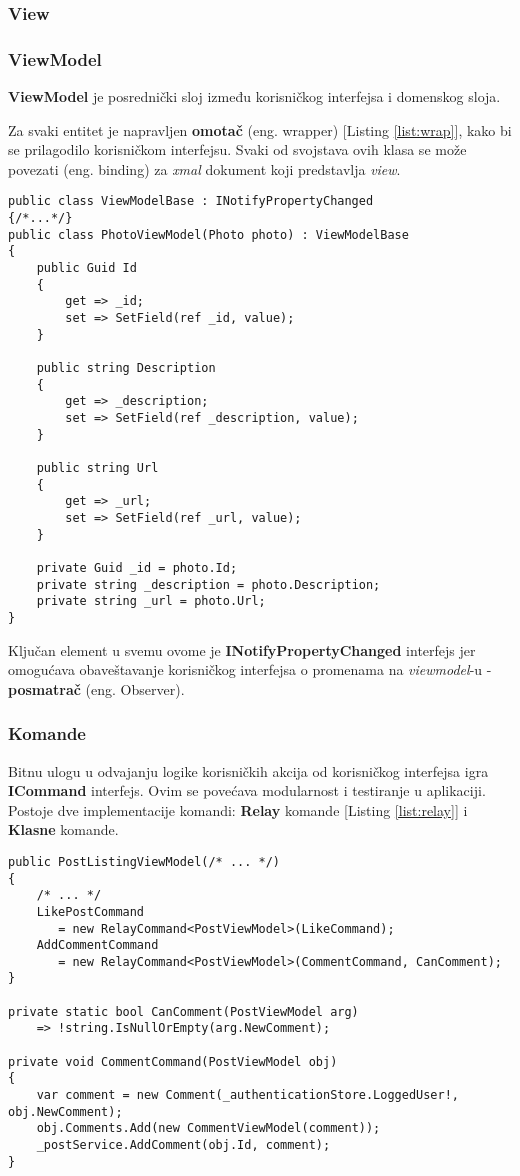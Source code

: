 \subsubsection*{View}
\subsubsection*{ViewModel}
\par \textbf{ViewModel} je posrednički sloj između korisničkog interfejsa i domenskog sloja.
\par Za svaki entitet je napravljen \textbf{omotač} (eng. wrapper) [Listing \ref{list:wrap}], kako bi se prilagodilo korisničkom interfejsu. Svaki od svojstava ovih klasa se može povezati
(eng. binding) za \textit{xmal} dokument koji predstavlja \textit{view}. 
\begin{lstlisting}[caption={Primer ViewModel omotača}, captionpos=b, label=list:wrap]
public class ViewModelBase : INotifyPropertyChanged 
{/*...*/}
public class PhotoViewModel(Photo photo) : ViewModelBase
{
    public Guid Id
    {
        get => _id;
        set => SetField(ref _id, value);
    }

    public string Description
    {
        get => _description;
        set => SetField(ref _description, value);
    }

    public string Url
    {
        get => _url;
        set => SetField(ref _url, value);
    }

    private Guid _id = photo.Id;
    private string _description = photo.Description;
    private string _url = photo.Url;
}
\end{lstlisting}
\par Ključan element u svemu ovome je  \textbf{INotifyPropertyChanged} interfejs jer 
omogućava obaveštavanje korisničkog interfejsa o promenama na \textit{viewmodel}-u - \textbf{posmatrač} (eng. Observer).
\subsubsection*{Komande}
\par Bitnu ulogu u odvajanju logike korisničkih akcija od korisničkog interfejsa igra \textbf{ICommand} interfejs. Ovim se povećava modularnost i testiranje u 
aplikaciji. Postoje dve implementacije komandi: \textbf{Relay} komande [Listing \ref{list:relay}] i \textbf{Klasne} komande.  
\begin{lstlisting}[caption={Primer \textit{relay} komande za dodavanje komentara}, captionpos=b, label=list:relay]
public PostListingViewModel(/* ... */)
{
    /* ... */
    LikePostCommand 
       = new RelayCommand<PostViewModel>(LikeCommand);
    AddCommentCommand 
       = new RelayCommand<PostViewModel>(CommentCommand, CanComment);
}

private static bool CanComment(PostViewModel arg) 
    => !string.IsNullOrEmpty(arg.NewComment);

private void CommentCommand(PostViewModel obj)
{
    var comment = new Comment(_authenticationStore.LoggedUser!, obj.NewComment);
    obj.Comments.Add(new CommentViewModel(comment));
    _postService.AddComment(obj.Id, comment);
}
\end{lstlisting}
